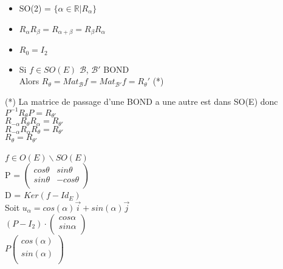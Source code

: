 \documentclass{article}
\begin{document}
\begin{itemize}
    \item SO(2) = $\{\alpha \in \mathbb{R} | R_{\alpha}\}$
    \item $R_{\alpha} R_{\beta} = R_{\alpha + \beta} = R_{\beta} R_{\alpha}$
    \item $R_0 = I_2$
    \item Si $f \in SO(E)$ $\mathcal{B}$, $\mathcal{B}'$ BOND\\
Alors $R_{\theta} = Mat_{\mathcal{B}} f = Mat_{\mathcal{B}'} f = R_{\theta}'$ (*)
\end{itemize}
(*) La matrice de passage d'une BOND a une autre est dans SO(E) donc\\
$P^{-1} R_{\theta} P = R_{\theta'}$\\
$R_{-\alpha} R_{\theta} R_{\alpha} = R_{\theta'}$\\
$R_{-\alpha} R_{\alpha} R_{\theta} = R_{\theta'}$\\
$R_{\theta} = R_{\theta'}$\\
\\
$f \in O(E) \backslash SO(E)$\\
P = $\begin{pmatrix}
    cos \theta & sin \theta\\
    sin \theta & -cos \theta\\
\end{pmatrix}$\\
D = $Ker(f - Id_E)$\\
Soit $u_{\alpha} = cos (\alpha) \vec{i} + sin (\alpha) \vec{j}$\\
$(P - I_2) \cdot \begin{pmatrix}
    cos \alpha\\
    sin \alpha\\
\end{pmatrix}$\\
$P \begin{pmatrix}
cos (\alpha)\\
sin (\alpha)\\
\end{pmatrix}$
\end{document}
